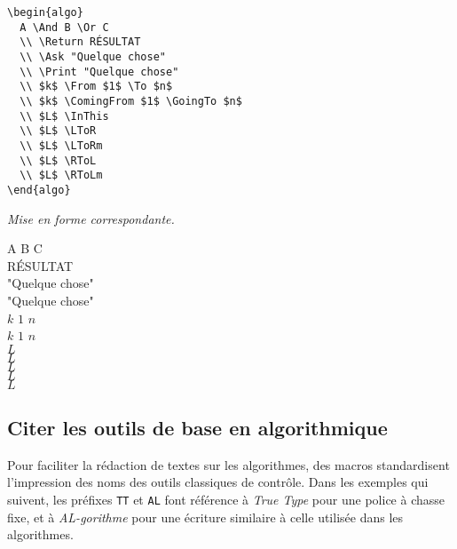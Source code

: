 \documentclass[12pt,a4paper]{article}
\theoremstyle{definition}
\newenvironment{frame-gene}[1][]{
	\begin{tcolorbox}[
		title        = #1, 
		colbacktitle = black!10!white, 
		colback      = white, 
		coltitle     = black,
		fonttitle    = \bfseries\itshape\small, 
		breakable,
		center title]
}{
	\end{tcolorbox}
}
\newcommand\myquote[1]{{\itshape \og #1 \fg}}
\begin{document}
\begin{multicols}{2}
    \centering
    \begin{frame-gene}
\begin{verbatim}
\begin{algo}
  A \And B \Or C
  \\ \Return RÉSULTAT
  \\ \Ask "Quelque chose"
  \\ \Print "Quelque chose"
  \\ $k$ \From $1$ \To $n$
  \\ $k$ \ComingFrom $1$ \GoingTo $n$
  \\ $L$ \InThis
  \\ $L$ \LToR
  \\ $L$ \LToRm
  \\ $L$ \RToL
  \\ $L$ \RToLm
\end{algo}
\end{verbatim}
    \end{frame-gene}
    \vfill\null
    \columnbreak
    \textit{Mise en forme correspondante.}
\begin{algo}
  A \And B \Or C
  \\ \Return RÉSULTAT
  \\ \Ask "Quelque chose"
  \\ \Print "Quelque chose"
  \\ $k$ \From $1$ \To $n$
  \\ $k$ \ComingFrom $1$ \GoingTo $n$
  \\ $L$ \InThis
  \\ $L$ \LToR
  \\ $L$ \LToRm
  \\ $L$ \RToL
  \\ $L$ \RToLm
\end{algo}
    \vfill\null
\end{multicols}






\subsection{Citer les outils de base en algorithmique}

Pour faciliter la rédaction de textes sur les algorithmes, des macros standardisent l'impression des noms des outils classiques de contrôle.
Dans les exemples qui suivent, les préfixes \verb+TT+ et \verb+AL+ font référence à \myquote{True Type} pour une police à chasse fixe, et à \myquote{AL-gorithme} pour une écriture similaire à celle utilisée dans les algorithmes.
\end{document}
